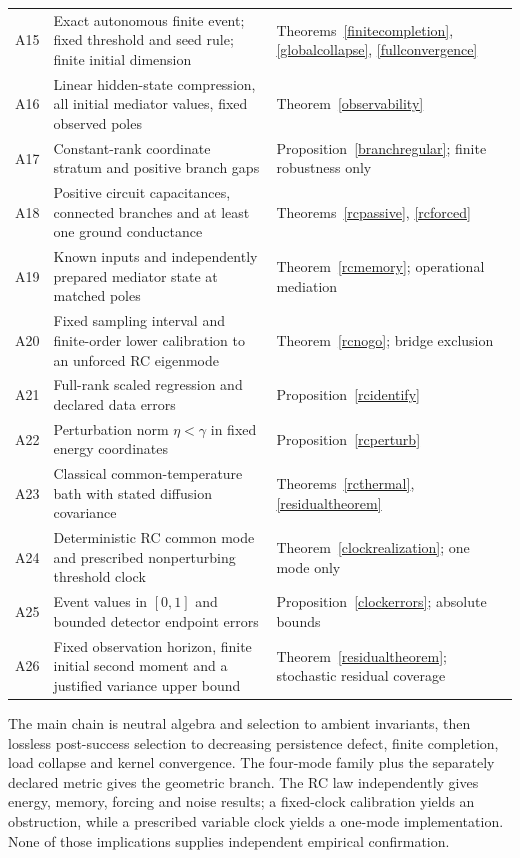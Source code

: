 \documentclass[11pt,letterpaper]{article}
\theoremstyle{definition}
\numberwithin{equation}{section}
\begin{document}
\begin{longtable}{p{}p{}p{}}
A15 & Exact autonomous finite event; fixed threshold and seed rule; finite initial dimension & Theorems~\ref{finitecompletion}, \ref{globalcollapse}, \ref{fullconvergence}\\
A16 & Linear hidden-state compression, all initial mediator values, fixed observed poles & Theorem~\ref{observability}\\
A17 & Constant-rank coordinate stratum and positive branch gaps & Proposition~\ref{branchregular}; finite robustness only\\
A18 & Positive circuit capacitances, connected branches and at least one ground conductance & Theorems~\ref{rcpassive}, \ref{rcforced}\\
A19 & Known inputs and independently prepared mediator state at matched poles & Theorem~\ref{rcmemory}; operational mediation\\
A20 & Fixed sampling interval and finite-order lower calibration to an unforced RC eigenmode & Theorem~\ref{rcnogo}; bridge exclusion\\
A21 & Full-rank scaled regression and declared data errors & Proposition~\ref{rcidentify}\\
A22 & Perturbation norm $\eta<\gamma$ in fixed energy coordinates & Proposition~\ref{rcperturb}\\
A23 & Classical common-temperature bath with stated diffusion covariance & Theorems~\ref{rcthermal}, \ref{residualtheorem}\\
A24 & Deterministic RC common mode and prescribed nonperturbing threshold clock & Theorem~\ref{clockrealization}; one mode only\\
A25 & Event values in $[0,1]$ and bounded detector endpoint errors & Proposition~\ref{clockerrors}; absolute bounds\\
A26 & Fixed observation horizon, finite initial second moment and a justified variance upper bound & Theorem~\ref{residualtheorem}; stochastic residual coverage\\



\bottomrule
\end{longtable}

The main chain is neutral algebra and selection to ambient invariants, then lossless post-success selection to decreasing persistence defect, finite completion, load collapse and kernel convergence. The four-mode family plus the separately declared metric gives the geometric branch. The RC law independently gives energy, memory, forcing and noise results; a fixed-clock calibration yields an obstruction, while a prescribed variable clock yields a one-mode implementation. None of those implications supplies independent empirical confirmation.
\end{document}
